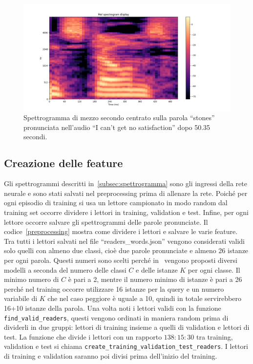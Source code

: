 \documentclass[12pt,a4paper,titlepage]{article}
\begin{document}
\begin{figure}[h]
	\centering	
	\includegraphics[width=1\textwidth]{../Stones_spectrogram}
	\caption{Spettrogramma di mezzo secondo centrato sulla parola ``stones'' pronunciata nell'audio ``I can't get no satisfaction'' dopo 50.35 secondi.}
	\label{fig:stones_spec}
\end{figure}


\subsection{Creazione delle feature}
\label{subsec:creazione_feature}
Gli spettrogrammi descritti in~\ref{subsec:spettrogramma} sono gli ingressi della rete neurale e sono stati salvati nel preprocessing prima di allenare la rete. Poiché per ogni episodio di training si usa un lettore campionato in modo random dal training set occorre dividere i lettori in training, validation e test. Infine, per ogni lettore occorre salvare gli spettrogrammi delle parole pronunciate. Il codice~\ref{preprocessing} mostra come dividere i lettori e salvare le varie feature. Tra tutti i lettori salvati nel file ``readers\_words.json'' vengono considerati validi solo quelli con almeno due classi, cioè due parole pronunciate e almeno 26 istanze per ogni parola. Questi numeri sono scelti perché in~\cite{salamon:Few-Shot} vengono proposti diversi modelli a seconda del numero delle classi $C$ e delle istanze $K$ per ogni classe. Il minimo numero di $C$ è pari a 2, mentre il numero minimo di istanze è pari a 26 perché nel training occorre utilizzare 16 istanze per la query e un numero variabile di $K$ che nel caso peggiore è uguale a 10, quindi in totale servirebbero 16+10 istanze della parola. Una volta noti i lettori validi con la funzione \texttt{find\_valid\_readers}, questi vengono ordinati in maniera random prima di dividerli in due gruppi: lettori di training insieme a quelli di validation e lettori di test. La funzione che divide i lettori con un rapporto $138:15:30$ tra training, validation e test si chiama \texttt{create\_training\_validation\_test\_readers}.
I lettori di training e validation saranno poi divisi prima dell'inizio del training.
\end{document}
